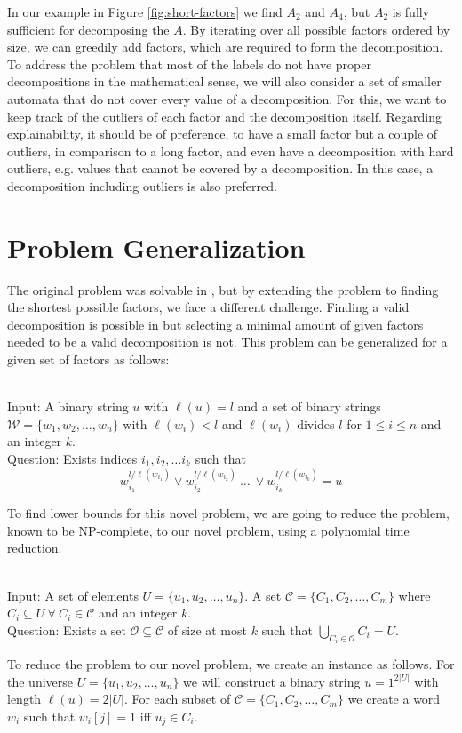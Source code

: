 In our example in Figure \ref{fig:short-factors} we find $A_2$ and $A_4$, but $A_2$ is fully sufficient for decomposing the \DFA $A$.
By iterating over all possible factors ordered by size, we can greedily add factors, which are required to form the decomposition.
To address the problem that most of the labels do not have proper decompositions in the mathematical sense, we will also consider a set of smaller automata that do not cover every value of a decomposition.
For this, we want to keep track of the outliers of each factor and the decomposition itself.
Regarding explainability, it should be of preference, to have a small factor but a couple of outliers, in comparison to a long factor, and even have a decomposition with hard outliers, e.g. values that cannot be covered by a decomposition.
In this case, a decomposition including outliers is also preferred.

\section{Problem Generalization}
The original problem was solvable in \LogSpace, but by extending the problem to finding the shortest possible factors, we face a different challenge.
Finding a valid decomposition is possible in \LogSpace but selecting a minimal amount of given factors needed to be a valid decomposition is not.
This problem can be generalized for a given set of factors as follows:
\begin{defn}{\ \\}
	Input: A binary string $u$ with $\ell(u)= l$ and a set of binary strings $\mathcal{W} = \{w_1, w_2, \dots, w_n\}$ with $\ell(w_i) < l$ and $\ell(w_i)$ divides $l$ for $1 \leq i \leq n$ and an integer $k$.\\
	Question: Exists indices $i_1, i_2, \dots i_k$ such that
	$$w_{i_1}^{l / \ell(w_{i_1})} \lor w_{i_2}^{l / \ell(w_{i_2})} ~\dots~ \lor w_{i_k}^{l / \ell(w_{i_k})} = u $$
\end{defn}

To find lower bounds for this novel problem, we are going to reduce the {} problem, known to be NP-complete, to our novel {} problem, using a polynomial time reduction.

\begin{defn}{\ \\}
	Input: A set of elements $U = \{u_1, u_2, \dots , u_n\}$. A set $\mathcal{C} = \{C_1, C_2, \dots , C_m\}$ where $C_i \subseteq U ~\forall~ C_i \in \mathcal{C}$ and an integer $k$.\\
	Question: Exists a set $\mathcal{O} \subseteq \mathcal{C}$ of size  at most $k$ such that $\underset{C_i \in \mathcal{O}}{\bigcup}C_i = U$.
\end{defn}
To reduce the {} problem to our novel problem, we create an instance as follows.
For the universe $U = \{u_1, u_2, \dots, u_n\}$ we will construct a binary string $u= 1^{2|U|}$ with length $\ell(u) = 2|U|$. For each subset of $\mathcal{C} = \{C_1, C_2, \dots, C_m\}$ we create a word $w_i$ such that $w_i[j] = 1$ iff $u_j \in C_i$. 

